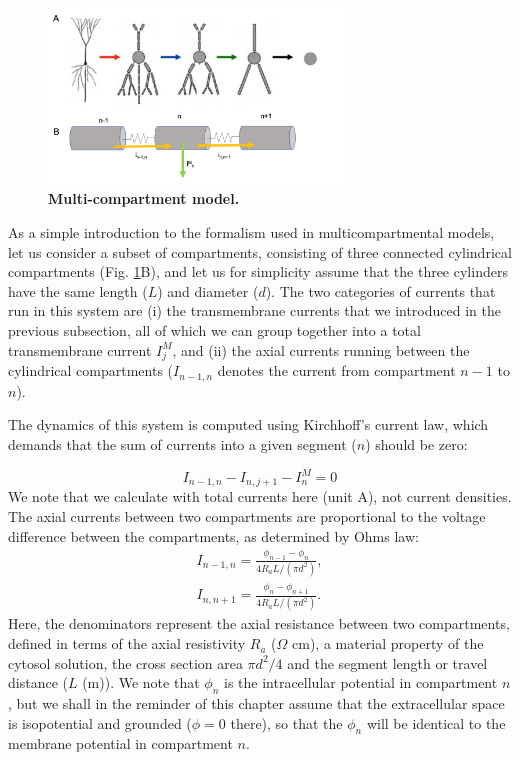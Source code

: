 \begin{figure}[!ht]
\begin{center}
\includegraphics[width=0.7\textwidth]{Fig02/Multikompis.png}
\end{center}
\caption{\textbf{Multi-compartment model.}
}
\label{fig:multikompisen}
\end{figure}

As a simple introduction to the formalism used in multicompartmental models, let us consider a subset of compartments, consisting of three connected cylindrical compartments (Fig. \ref{fig:multikompisen}B), and let us for simplicity assume that the three cylinders have the same length ($L$) and diameter ($d$). The two categories of currents that run in this system are (i) the transmembrane currents that we introduced in the previous subsection, all of which we can group together into a total transmembrane current $I^M_j$, and (ii) the axial currents running between the cylindrical compartments ($I_{n-1,n}$ denotes the current from compartment $n-1$ to $n$). 

The dynamics of this system is computed using Kirchhoff's current law, which demands that the sum of currents into a given segment ($n$) should be zero:

\begin{equation}
I_{n-1,n} - I_{n,j+1} - I^M_n = 0
\label{eq:Kirch}
\end{equation}
We note that we calculate with total currents here (unit A), not current densities. The axial currents between two compartments are proportional to the voltage difference between the compartments, as determined by Ohms law:
\begin{eqnarray}
I_{n-1,n} = \frac{\phi_{n-1}-\phi_n}{4 R_a L/(\pi d^2)}, \nonumber \\ 
I_{n,n+1} = \frac{\phi_{n}-\phi_{n+1}}{4 R_a L/(\pi d^2)}.
\label{eq:axialcurrents}
\end{eqnarray}
Here, the denominators represent the axial resistance between two compartments, defined in terms of the axial resistivity $R_a$ ($\Omega$ cm), a material property of the cytosol solution, the cross section area $\pi d^2/4$ and the segment length or travel distance ($L$ (m)). We note that $\phi_n$ is the intracellular potential in compartment $n$, but we shall in the reminder of this chapter assume that the extracellular space is isopotential and grounded ($\phi = 0$ there), so that the $\phi_n$ will be identical to the membrane potential in compartment $n$.

